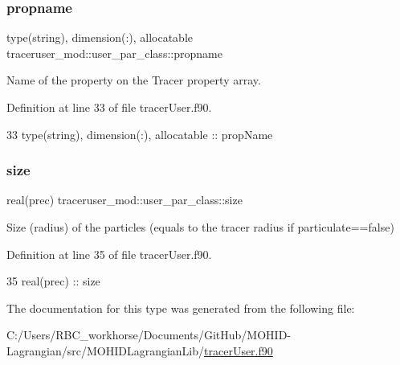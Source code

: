 \subsubsection{\texorpdfstring{propname}{propname}}
{\footnotesize\ttfamily type(string), dimension(\+:), allocatable traceruser\+\_\+mod\+::user\+\_\+par\+\_\+class\+::propname\hspace{0.3cm}{\ttfamily [private]}}



Name of the property on the Tracer property array. 



Definition at line 33 of file tracer\+User.\+f90.


\begin{DoxyCode}
33         \textcolor{keywordtype}{type}(string), \textcolor{keywordtype}{dimension(:)}, \textcolor{keywordtype}{allocatable} :: propName
\end{DoxyCode}
\mbox{\label{structtraceruser__mod_1_1user__par__class_ac403ed1bb4162acf2704054f51026827}} 
\subsubsection{\texorpdfstring{size}{size}}
{\footnotesize\ttfamily real(prec) traceruser\+\_\+mod\+::user\+\_\+par\+\_\+class\+::size\hspace{0.3cm}{\ttfamily [private]}}



Size (radius) of the particles (equals to the tracer radius if particulate==false) 



Definition at line 35 of file tracer\+User.\+f90.


\begin{DoxyCode}
35         \textcolor{keywordtype}{real(prec)}   :: size
\end{DoxyCode}


The documentation for this type was generated from the following file\+:\begin{DoxyCompactItemize}
\item 
C\+:/\+Users/\+R\+B\+C\+\_\+workhorse/\+Documents/\+Git\+Hub/\+M\+O\+H\+I\+D-\/\+Lagrangian/src/\+M\+O\+H\+I\+D\+Lagrangian\+Lib/\mbox{\hyperlink{tracer_user_8f90}{tracer\+User.\+f90}}\end{DoxyCompactItemize}
